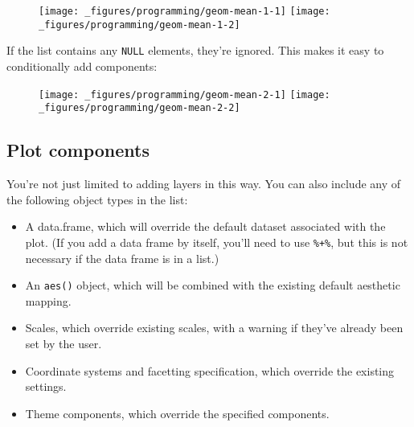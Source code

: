 \begin{figure}[H]
  \centering
  \texttt{[image: \_figures/programming/geom-mean-1-1]}%
  \texttt{[image: \_figures/programming/geom-mean-1-2]}
\end{figure}

If the list contains any \texttt{NULL} elements, they're ignored. This
makes it easy to conditionally add components:

\begin{Shaded}
\begin{Highlighting}[]
\StringTok{ } \NormalTok{) \{}
  \NormalTok{(}
    \NormalTok{(} \NormalTok{, } \NormalTok{, } \NormalTok{),}
      \NormalTok{(} \NormalTok{, } \NormalTok{, } \NormalTok{)}
  \NormalTok{)}
\NormalTok{\}}
\StringTok{ }\NormalTok{()}
\StringTok{ }\NormalTok{(} \NormalTok{)}
\end{Highlighting}
\end{Shaded}

\begin{figure}[H]
  \centering
  \texttt{[image: \_figures/programming/geom-mean-2-1]}%
  \texttt{[image: \_figures/programming/geom-mean-2-2]}
\end{figure}

\subsection{Plot components}

You're not just limited to adding layers in this way. You can also
include any of the following object types in the list:

\begin{itemize}
\item
  A data.frame, which will override the default dataset associated with
  the plot. (If you add a data frame by itself, you'll need to use
  \texttt{\%+\%}, but this is not necessary if the data frame is in a
  list.)
\item
  An \texttt{aes()} object, which will be combined with the existing
  default aesthetic mapping.
\item
  Scales, which override existing scales, with a warning if they've
  already been set by the user.
\item
  Coordinate systems and facetting specification, which override the
  existing settings.
\item
  Theme components, which override the specified components.
\end{itemize}

